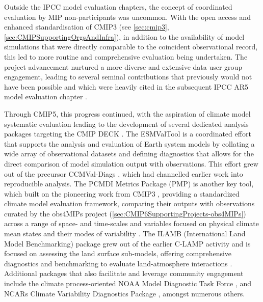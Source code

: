 \documentclass[manuscript]{copernicus}
\begin{document}
Outside the IPCC model evaluation chapters, the concept of coordinated evaluation by MIP non-participants was uncommon. With the open access and enhanced standardisation of CMIP3 (see \autoref{sec:cmip3}, \autoref{sec:CMIPSupportingOrgsAndInfra}), in addition to the availability of model simulations that were directly comparable to the coincident observational record, this led to more routine and comprehensive evaluation being undertaken. The project advancement nurtured a more diverse and extensive data user group engagement, leading to several seminal contributions that previously would not have been possible \citep[e.g.,][]{eyring_assessment_2006,gleckler_performance_2008,waugh_quantitative_2008} and which were heavily cited in the subsequent IPCC AR5 model evaluation chapter \citep{flato_evaluation_2013}.

Through CMIP5, this progress continued, with the aspiration of climate model systematic evaluation leading to the development of several dedicated analysis packages targeting the CMIP DECK \citep{eyring_towards_2016}. The ESMValTool \citep[Earth System Model Evaluation Tool;][]{eyring_esmvaltool_2016,righi_earth_2020,eyring_earth_2020} is a coordinated effort that supports the analysis and evaluation of Earth system models by collating a wide array of observational datasets and defining diagnostics that allows for the direct comparison of model simulation output with observations. This effort grew out of the precursor CCMVal-Diags \citep[Chemistry-Climate Model Validation Diagnostic tool;][]{gettelman_community_2012}, which had channelled earlier work \citep{eyring_assessment_2006,waugh_quantitative_2008} into reproducible analysis. The PCMDI Metrics Package (PMP) is another key tool, which built on the pioneering work from CMIP3 \citep{gleckler_performance_2008}, providing a standardized climate model evaluation framework, comparing their outputs with observations curated by the obs4MIPs project (\autoref{sec:CMIP6SupportingProjects-obs4MIPs}) across a range of space- and time-scales and variables focused on physical climate mean states and their modes of variability \citep{gleckler_more_2016,lee_systematic_2024}. The ILAMB (International Land Model Benchmarking) package grew out of the earlier C-LAMP activity \citep{hoffman_results_2007} and is focused on assessing the land surface sub-models, offering comprehensive diagnostics and benchmarking to evaluate land-atmosphere interactions \citep{collier_international_2018}. Additional packages that also facilitate and leverage community engagement include the climate process-oriented NOAA Model Diagnostic Task Force \citep[NOAA-MDTF;][]{neelin_process-oriented_2023}, and NCARs Climate Variability Diagnostics Package \citep[CVDP;][]{phillips_evaluating_2014}, amongst numerous others.
\end{document}

